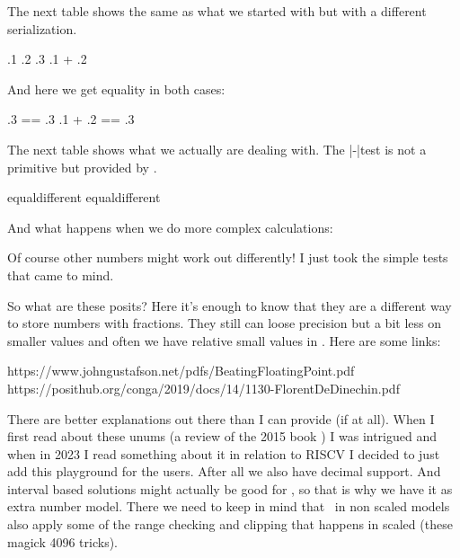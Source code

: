 \stopsectionlevel

\startsectionlevel[title=Posits]


The next table shows the same as what we started with but with a different
serialization.

\starttabulate[|Tr|r|]
\NC .1      \NC {}  \NC \NR
\NC .2      \NC {}  \NC \NR
\NC .3      \NC {}  \NC \NR
\NC .1 + .2 \NC {}  \NC \NR
\stoptabulate

And here we get equality in both cases:

\starttabulate[|Tr|l|]
\NC      .3 == .3 \NC {} \NC \NR
\NC .1 + .2 == .3 \NC {} \NC \NR
\stoptabulate

The next table shows what we actually are dealing with. The \type {\if}|-|test is
not a primitive but provided by \CONTEXT.

\starttabulate[|Tr|l|]
\NC {} \NC {} equal\else different\fi \NC \NR
\NC {} \NC {} equal\else different\fi \NC \NR
\stoptabulate

And what happens when we do more complex calculations:

\starttabulate[|Tr|l|]
\NC {} \NC {} \NC \NR
\NC {} \NC             {}       \NC \NR
\stoptabulate

Of course other numbers might work out differently! I just took the simple tests
that came to mind.

So what are these posits? Here it's enough to know that they are a different way
to store numbers with fractions. They still can loose precision but a bit less on
smaller values and often we have relative small values in \TEX. Here are some links:

\starttyping
https://www.johngustafson.net/pdfs/BeatingFloatingPoint.pdf
https://posithub.org/conga/2019/docs/14/1130-FlorentDeDinechin.pdf
\stoptyping

There are better explanations out there than I can provide (if at all). When I
first read about these unums (a review of the 2015 book ) I was intrigued and when in 2023 I read something about it
in relation to RISCV I decided to just add this playground for the users. After
all we also have decimal support. And interval based solutions might actually be
good for \METAPOST, so that is why we have it as extra number model. There we
need to keep in mind that \METAPOST\ in non scaled models also apply some of the
range checking and clipping that happens in scaled (these magick 4096 tricks).

